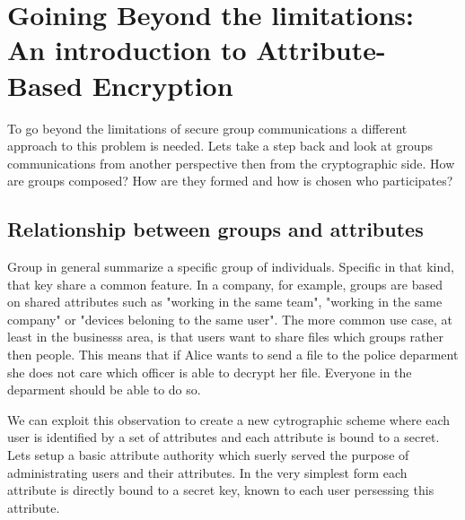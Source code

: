 \section{Goining Beyond the limitations: An introduction to Attribute-Based Encryption}

To go beyond the limitations of secure group communications a different approach to this problem is needed. Lets take a step back and look at groups communications from another perspective then from the cryptographic side. How are groups composed? How are they formed and how is chosen who participates? 

\subsection{Relationship between groups and attributes}
Group in general summarize a specific group of individuals. Specific in that kind, that key share a common feature. In a company, for example, groups are based on shared attributes such as "working in the same team", "working in the same company" or "devices beloning to the same user". The more common use case, at least in the businesss area, is that users want to share files which groups rather then people. This means that if Alice wants to send a file to the police deparment she does not care which officer is able to decrypt her file. Everyone in the deparment should be able to do so.  

We can exploit this observation to create a new cytrographic scheme where each user is identified by a set of attributes and each attribute is bound to a secret. Lets setup a basic attribute authority which suerly served the purpose of administrating users and their attributes. In the very simplest form each attribute is directly bound to a secret key, known to each user persessing this attribute. 

